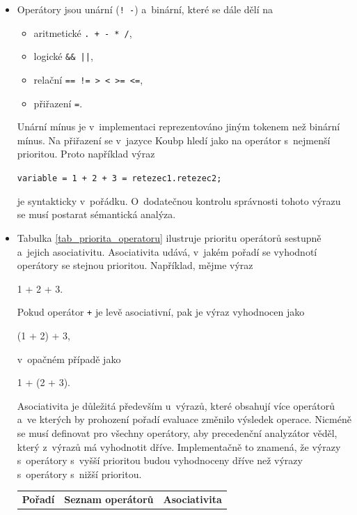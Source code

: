 \begin{itemize}
    \item Operátory jsou unární (\texttt{! -}) a~binární, které se dále dělí na
    \begin{itemize}[label=$\circ$]
        \item aritmetické \texttt{. + - * /},
        \item logické \texttt{\&\& ||},
        \item relační \texttt{== != > < >= <=},
        \item přiřazení \texttt{=}.
    \end{itemize}
    Unární mínus je v~implementaci reprezentováno jiným tokenem než binární mínus.
    Na přiřazení se v~jazyce Koubp hledí jako na operátor s~nejmenší prioritou.
    Proto například výraz
    \begin{center}
        \texttt{variable = 1 + 2 + 3 = retezec1.retezec2;}
    \end{center}
    je syntakticky v~pořádku.
    O~dodatečnou kontrolu správnosti tohoto výrazu se musí postarat sémantická analýza. 
    \item Tabulka \ref{tab_priorita_operatoru} ilustruje prioritu operátorů sestupně a~jejich asociativitu.
    Asociativita udává, v~jakém pořadí se vyhodnotí operátory se stejnou prioritou.
    Například, mějme výraz
    \begin{center}
        1 + 2 + 3.
    \end{center}
    Pokud operátor \texttt{+} je levě asociativní, pak je výraz vyhodnocen jako
    \begin{center}
        (1 + 2) + 3,
    \end{center}
    v~opačném případě jako
    \begin{center}
        1 + (2 + 3).
    \end{center}
    Asociativita je důležitá především u~výrazů, které obsahují více operátorů a~ve kterých by prohození pořadí evaluace změnilo výsledek operace.
    Nicméně se musí definovat pro všechny operátory, aby precedenční analyzátor věděl, který z~výrazů má vyhodnotit dříve.
    Implementačně to znamená, že výrazy s~operátory s~vyšší prioritou budou vyhodnoceny dříve než výrazy s~operátory s~nižší prioritou.
    \begin{table}[ht]
        \centering
        \begin{tabularx}{0.7\textwidth}{p{}p{}X}
            \toprule
            \textbf{Pořadí} & \textbf{Seznam operátorů} & \textbf{Asociativita} \\

\end{tabularx}
\end{table}
\end{itemize}
